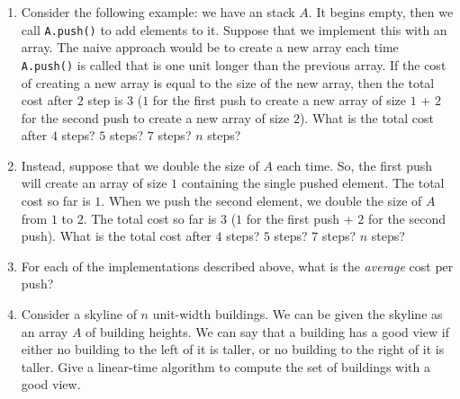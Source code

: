\documentclass{article}
\begin{document}
\begin{enumerate}[(1)]
    \item Consider the following example: we have an stack $A$.  It
        begins empty, then we call \texttt{A.push()} to add elements to it.
        Suppose that we implement this with an array.  The naive approach would
        be to create a new array each time \texttt{A.push()} is called that is
        one unit longer than the previous array.  If the
        cost of creating a new array is equal to the size of the new array, then the total cost after
        $2$ step is $3$ ($1$ for the first push to create a new array of size
        $1$ + $2$ for the second push to create a new array of size $2$).
        What is the total cost after $4$ steps?  $5$ steps? $7$ steps? $n$ steps?
        \vspace{1in}
    \item Instead, suppose that we double the size of $A$ each time.  So, the
        first push will create an array of size $1$ containing the single pushed
        element.  The total cost so far is $1$.  When we push the second
        element, we double the size of $A$ from $1$ to $2$.
        The total cost so far is $3$ ($1$ for the first push + $2$ for the second
        push).  What is the total cost after $4$ steps? $5$ steps? $7$ steps?
        $n$ steps?
        \vspace{1in}
    \item For each of the implementations described above, what is the
        \emph{average} cost per push?
    \pagebreak
    \item Consider a skyline of $n$ unit-width buildings.  We can be given the
        skyline as an array $A$ of building heights.  We can say that a building
        has a good view if either no building to the left of it is taller, or no
        building to the right of it is taller.  Give a linear-time algorithm to
        compute the set of buildings with a good view.
\end{enumerate}
\end{document}
